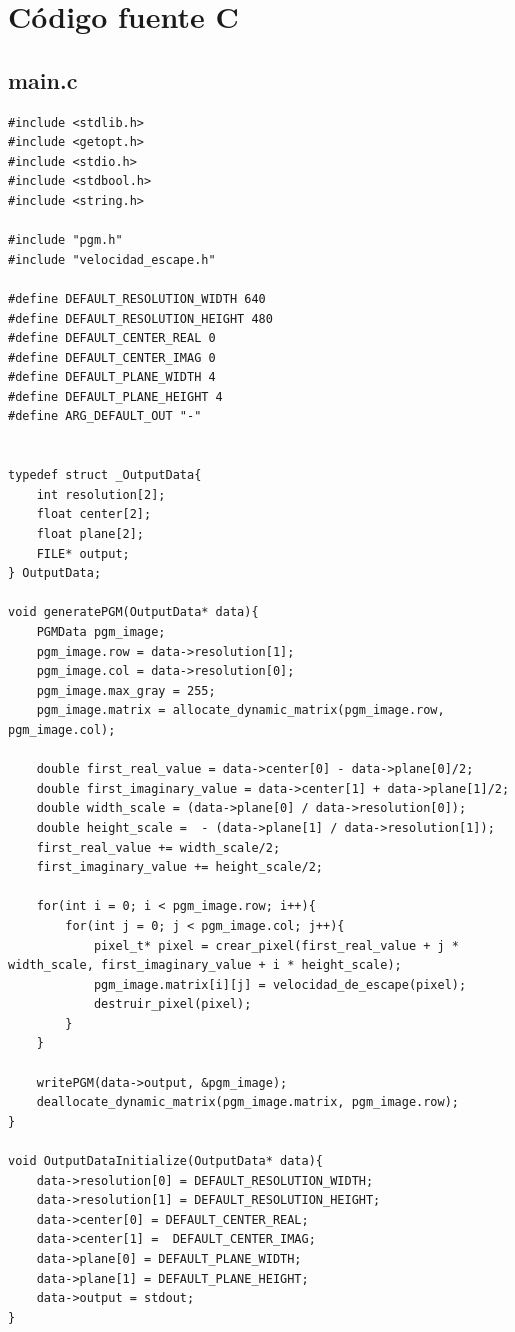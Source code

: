\documentclass[a4paper,10pt]{article}
\begin{document}
\pagebreak


\section{C\'odigo fuente C}

\subsection{main.c}

\begin{verbatim}
#include <stdlib.h>
#include <getopt.h>
#include <stdio.h>
#include <stdbool.h>
#include <string.h>

#include "pgm.h"
#include "velocidad_escape.h"

#define DEFAULT_RESOLUTION_WIDTH 640
#define DEFAULT_RESOLUTION_HEIGHT 480
#define DEFAULT_CENTER_REAL 0
#define DEFAULT_CENTER_IMAG 0
#define DEFAULT_PLANE_WIDTH 4
#define DEFAULT_PLANE_HEIGHT 4
#define ARG_DEFAULT_OUT "-"


typedef struct _OutputData{
    int resolution[2];
    float center[2];
    float plane[2];
    FILE* output;
} OutputData;

void generatePGM(OutputData* data){
    PGMData pgm_image;
    pgm_image.row = data->resolution[1];
    pgm_image.col = data->resolution[0];
    pgm_image.max_gray = 255;
    pgm_image.matrix = allocate_dynamic_matrix(pgm_image.row, pgm_image.col);

    double first_real_value = data->center[0] - data->plane[0]/2;
    double first_imaginary_value = data->center[1] + data->plane[1]/2;
    double width_scale = (data->plane[0] / data->resolution[0]);
    double height_scale =  - (data->plane[1] / data->resolution[1]);
    first_real_value += width_scale/2;
    first_imaginary_value += height_scale/2;

    for(int i = 0; i < pgm_image.row; i++){
        for(int j = 0; j < pgm_image.col; j++){
            pixel_t* pixel = crear_pixel(first_real_value + j * width_scale, first_imaginary_value + i * height_scale);
            pgm_image.matrix[i][j] = velocidad_de_escape(pixel);
            destruir_pixel(pixel);
        }
    }

    writePGM(data->output, &pgm_image);
    deallocate_dynamic_matrix(pgm_image.matrix, pgm_image.row);
}

void OutputDataInitialize(OutputData* data){
    data->resolution[0] = DEFAULT_RESOLUTION_WIDTH;
    data->resolution[1] = DEFAULT_RESOLUTION_HEIGHT;
    data->center[0] = DEFAULT_CENTER_REAL;
    data->center[1] =  DEFAULT_CENTER_IMAG;
    data->plane[0] = DEFAULT_PLANE_WIDTH;
    data->plane[1] = DEFAULT_PLANE_HEIGHT;
    data->output = stdout;
}


\end{verbatim}
\end{document}
